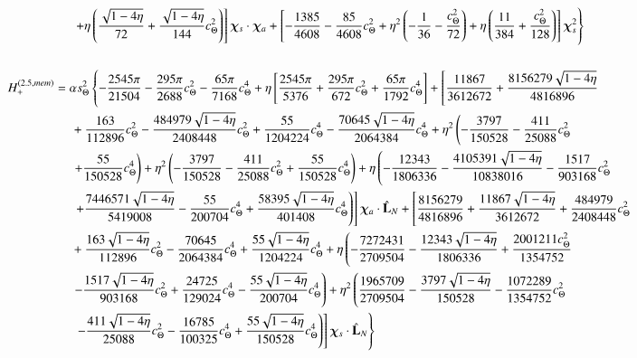 \documentclass[twocolumn,showpacs,aps,prd,nobibnotes,floatfix]{revtex4-1}
\begin{document}
\begin{widetext}
\begin{subequations}
\begin{align}
	& \qquad\qquad\quad \left. \left.+ \eta\left(\frac{\sqrt{1-4\eta}}{72} + \frac{\sqrt{1-4\eta}}{144}c_{\Theta}^2\right)\right]\chisDchia + \left[-\frac{1385}{4608}-\frac{85}{4608}c_{\Theta}^2 + \eta^2\left(-\frac{1}{36}-\frac{c_{\Theta}^2}{72}\right)+ \eta\left(\frac{11}{384} + \frac{c_{\Theta}^2}{128}\right)\right]\chisSqr\right\}\nonumber\\
	\\
	& H_{+}^{(2.5,mem)} =\alpha s_{\Theta}^2\left\{-\frac{2545\pi}{21504} - \frac{295\pi}{2688}c_{\Theta}^2 -\frac{65\pi}{7168}c_{\Theta}^4 + \eta\left[\frac{2545\pi}{5376} + \frac{295\pi}{672}c_{\Theta}^2 + \frac{65\pi}{1792}c_{\Theta}^4\right] + \left[\frac{11867}{3612672} + \frac{8156279\sqrt{1-4\eta}}{4816896}\right.\right.\nonumber\\
	& \qquad\qquad\quad + \frac{163}{112896}c_{\Theta}^2 - \frac{484979\sqrt{1-4\eta}}{2408448}c_{\Theta}^2 + \frac{55}{1204224}c_{\Theta}^4 -\frac{70645\sqrt{1-4\eta}}{2064384}c_{\Theta}^4 + \eta^2\left(-\frac{3797}{150528}-\frac{411}{25088}c_{\Theta}^2\right.\nonumber\\
	& \qquad\qquad\quad \left.+ \frac{55}{150528}c_{\Theta}^4\right) + \eta^2\left(-\frac{3797}{150528}-\frac{411}{25088}c_{\Theta}^2+\frac{55}{150528}c_{\Theta}^4\right) + \eta\left(-\frac{12343}{1806336}-\frac{4105391\sqrt{1-4\eta}}{10838016}-\frac{1517}{903168}c_{\Theta}^2 \right.\nonumber\\ &\qquad\qquad\quad\left.\left.+\frac{7446571\sqrt{1-4\eta}}{5419008}-\frac{55}{200704}c_{\Theta}^4 + \frac{58395\sqrt{1-4\eta}}{401408}c_{\Theta}^4\right)\right]\chiadL + \left[\frac{8156279}{4816896}+ \frac{11867\sqrt{1-4\eta}}{3612672}+ \frac{484979}{2408448}c_{\Theta}^2 \right.\nonumber\\
	&\qquad\qquad\quad + \frac{163\sqrt{1-4\eta}}{112896}c_{\Theta}^2 - \frac{70645}{2064384}c_{\Theta}^4 + \frac{55\sqrt{1-4\eta}}{1204224}c_{\Theta}^4 + \eta\left(-\frac{7272431}{2709504}-\frac{12343\sqrt{1-4\eta}}{1806336} + \frac{2001211c_{\Theta}^2}{1354752}\right.\nonumber\\
	&\qquad\qquad\quad\left. -\frac{1517\sqrt{1-4\eta}}{903168}c_{\Theta}^2 + \frac{24725}{129024}c_{\Theta}^4 - \frac{55\sqrt{1-4\eta}}{200704}c_{\Theta}^4\right) + \eta^2\left(\frac{1965709}{2709504}-\frac{3797\sqrt{1-4\eta}}{150528}-\frac{1072289}{1354752}c_{\Theta}^2\right.\nonumber\\
	&\qquad\qquad\quad\left.\left.\left. -\frac{411\sqrt{1-4\eta}}{25088}c_{\Theta}^2 - \frac{16785}{100325}c_{\Theta}^4 + \frac{55\sqrt{1-4\eta}}{150528}c_{\Theta}^4\right)\right]\chisdL\right\}\nonumber\\

\end{align}
\end{subequations}
\end{widetext}
\end{document}
